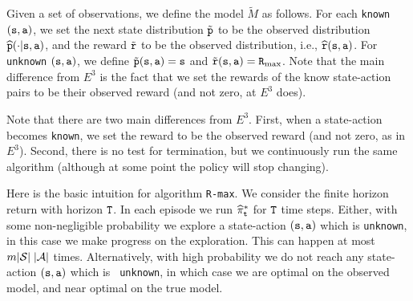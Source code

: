 
Given a set of observations, we define the model $\widetilde{M}$ as
follows. For each \texttt{known} $({\tt s},{\tt a})$, we set the next state
distribution $\tilde{{\tt p}}$ to be the observed distribution
$\widehat{{\tt p}}(\cdot|{\tt s},{\tt a})$, and the reward
$\tilde{{\tt r}}$ to be the observed distribution, i.e.,
$\widehat{{\tt r}}({\tt s},{\tt a})$.
%
For \texttt{unknown} $({\tt s},{\tt a})$, we define
$\tilde{{\tt p}}({\tt s},{\tt a})={\tt s}$ and
$\tilde{{\tt r}}({\tt s},{\tt a})={\tt R}_{\max }$. Note that the main
difference from $E^3$ is the fact that we set the rewards of the
know state-action pairs to be their observed reward (and not zero,
at $E^3$ does).




Note that there are two main differences from $E^3$. First, when a
state-action becomes \texttt{known}, we set the reward to be the observed
reward (and not zero, as in $E^3$). Second, there is no test for
termination, but we continuously run the same algorithm (although at
some point the policy will stop changing).


Here is the basic intuition for algorithm {\tt R-max}. We consider
the finite horizon return with horizon ${\tt T}$.  In each episode
we run $\widehat{\pi}^*_{\tt t}$ for ${\tt T}$ time steps.
Either, with some non-negligible probability we explore a
state-action $({\tt s},{\tt a})$ which is \texttt{unknown}, in this case
we make progress on the exploration.  This can happen at most
$m|\mathcal{S}|\;|\mathcal{A}|$ times. Alternatively, with high probability
we do not reach any state-action $({\tt s},{\tt a})$ which is {\tt
unknown}, in which case we are optimal on the observed model, and
near optimal on the true model.

